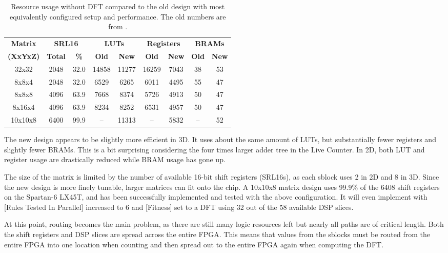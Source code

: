 \begin{table}[!ht]
    \renewcommand{\arraystretch}{1.4}
    \centering
    \begin{tabular}{c|c|c|c|c|c|c|c|c}
        \bfseries Matrix & \multicolumn{2}{c|}{\bfseries SRL16} & \multicolumn{2}{c|}{\bfseries LUTs} & \multicolumn{2}{c|}{\bfseries Registers} & \multicolumn{2}{c}{\bfseries BRAMs} \\
        \bfseries (XxYxZ) & \bfseries Total & \bfseries \% & \bfseries Old & \bfseries New & \bfseries Old & \bfseries New & \bfseries Old & \bfseries New \\
        \hline
        32x32 & 2048 & 32.0 & 14858 & 11277 & 16259 & 7043 & 38 & 53 \\
        8x8x4 & 2048 & 32.0 & 6529 & 6265 & 6011 & 4495 & 55 & 47 \\
        8x8x8 & 4096 & 63.9 & 7668 & 8374 & 5726 & 4913 & 50 & 47 \\
        8x16x4 & 4096 & 63.9 & 8234 & 8252 & 6531 & 4957 & 50 & 47 \\
        10x10x8 & 6400 & 99.9 & – & 11313 & – & 5832 & – & 52 \\
    \end{tabular}
    \caption[Resource usage]{
        Resource usage without DFT compared to the old design with most equivalently configured setup and performance.
        The old numbers are from \cite{stovneng2014sblock}.
    }
    \label{tab:resource-usage}
\end{table}

The new design appears to be slightly more efficient in 3D.
It uses about the same amount of LUTs, but substantially fewer registers and slightly fewer BRAMs.
This is a bit surprising considering the four times larger adder tree in the Live Counter.
In 2D, both LUT and register usage are drastically reduced while BRAM usage has gone up.

The size of the matrix is limited by the number of available 16-bit shift registers (SRL16s), as each sblock uses 2 in 2D and 8 in 3D.
Since the new design is more finely tunable, larger matrices can fit onto the chip.
A 10x10x8 matrix design uses 99.9\% of the 6408 shift registers on the Spartan-6 LX45T, and has been successfully implemented and tested with the above configuration.
It will even implement with [Rules Tested In Parallel] increased to 6 and [Fitness] set to a DFT using 32 out of the 58 available DSP slices.

At this point, routing becomes the main problem, as there are still many logic resources left but nearly all paths are of critical length.
Both the shift registers and DSP slices are spread across the entire FPGA.
This means that values from the sblocks must be routed from the entire FPGA into one location when counting and then spread out to the entire FPGA again when computing the DFT.

